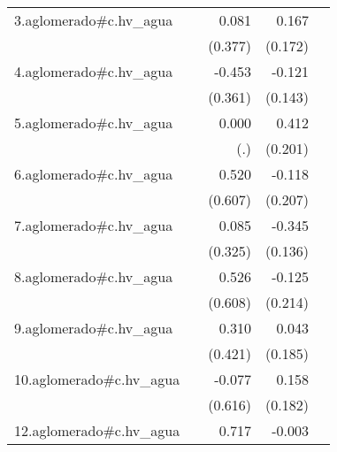 {\begin{longtable}{l*{4}{D{.}{.}{-1}}}
\addlinespace
3.aglomerado#c.hv\_agua&                     &       0.081         &       0.167         &                     \\
            &                     &     (0.377)         &     (0.172)         &                     \\
\addlinespace
4.aglomerado#c.hv\_agua&                     &      -0.453         &      -0.121         &                     \\
            &                     &     (0.361)         &     (0.143)         &                     \\
\addlinespace
5.aglomerado#c.hv\_agua&                     &       0.000         &       0.412\sym{*}  &                     \\
            &                     &         (.)         &     (0.201)         &                     \\
\addlinespace
6.aglomerado#c.hv\_agua&                     &       0.520         &      -0.118         &                     \\
            &                     &     (0.607)         &     (0.207)         &                     \\
\addlinespace
7.aglomerado#c.hv\_agua&                     &       0.085         &      -0.345\sym{*}  &                     \\
            &                     &     (0.325)         &     (0.136)         &                     \\
\addlinespace
8.aglomerado#c.hv\_agua&                     &       0.526         &      -0.125         &                     \\
            &                     &     (0.608)         &     (0.214)         &                     \\
\addlinespace
9.aglomerado#c.hv\_agua&                     &       0.310         &       0.043         &                     \\
            &                     &     (0.421)         &     (0.185)         &                     \\
\addlinespace
10.aglomerado#c.hv\_agua&                     &      -0.077         &       0.158         &                     \\
            &                     &     (0.616)         &     (0.182)         &                     \\
\addlinespace
12.aglomerado#c.hv\_agua&                     &       0.717         &      -0.003         &                     \\

\end{longtable}}
